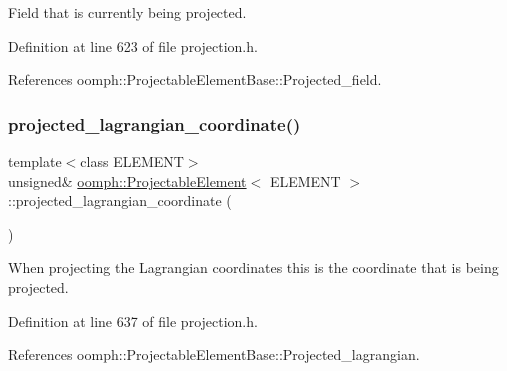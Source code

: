 Field that is currently being projected. 



Definition at line 623 of file projection.\+h.



References oomph\+::\+Projectable\+Element\+Base\+::\+Projected\+\_\+field.

\mbox{\label{classoomph_1_1ProjectableElement_a8ee3e91f6fdedeb5e6979e162437b2be}} 
\subsubsection{\texorpdfstring{projected\+\_\+lagrangian\+\_\+coordinate()}{projected\_lagrangian\_coordinate()}}
{\footnotesize\ttfamily template$<$class E\+L\+E\+M\+E\+NT$>$ \\
unsigned\& \hyperlink{classoomph_1_1ProjectableElement}{oomph\+::\+Projectable\+Element}$<$ E\+L\+E\+M\+E\+NT $>$\+::projected\+\_\+lagrangian\+\_\+coordinate (\begin{DoxyParamCaption}{ }\end{DoxyParamCaption})\hspace{0.3cm}{\ttfamily [inline]}}



When projecting the Lagrangian coordinates this is the coordinate that is being projected. 



Definition at line 637 of file projection.\+h.



References oomph\+::\+Projectable\+Element\+Base\+::\+Projected\+\_\+lagrangian.

\mbox{\label{classoomph_1_1ProjectableElement_a1ff7a9207ec5e4fc2508e75064e136de}} 
